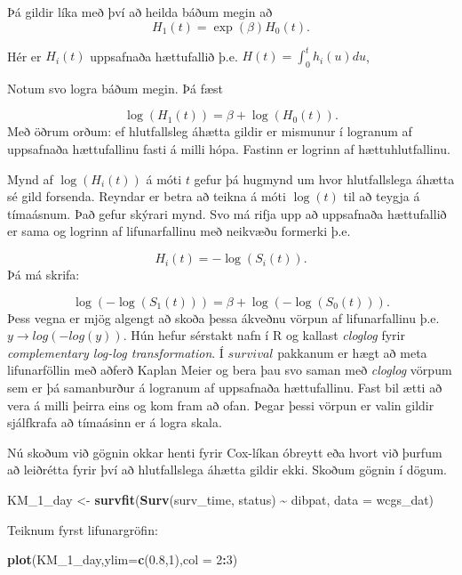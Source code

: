\documentclass[
]{book}
\newenvironment{Shaded}{\begin{snugshade}}{\end{snugshade}}
\newcommand{\DataTypeTok}[1]{\textcolor[rgb]{0.13,0.29,0.53}{#1}}
\newcommand{\DecValTok}[1]{\textcolor[rgb]{0.00,0.00,0.81}{#1}}
\newcommand{\FloatTok}[1]{\textcolor[rgb]{0.00,0.00,0.81}{#1}}
\newcommand{\KeywordTok}[1]{\textcolor[rgb]{0.13,0.29,0.53}{\textbf{#1}}}
\newcommand{\NormalTok}[1]{#1}
\newcommand{\OperatorTok}[1]{\textcolor[rgb]{0.81,0.36,0.00}{\textbf{#1}}}
\newcommand{\StringTok}[1]{\textcolor[rgb]{0.31,0.60,0.02}{#1}}
\begin{document}
Þá gildir líka með því að heilda báðum megin að
\[
H_1(t) = \exp(\beta)H_0(t).
\]

Hér er \(H_i(t)\) uppsafnaða hættufallið þ.e. \(H(t) = \int_0^t h_i(u)du\),

Notum svo logra báðum megin. Þá fæst

\[
\log(H_1(t)) = \beta + \log(H_0(t)).
\]
Með öðrum orðum: ef hlutfallsleg áhætta gildir er mismunur í logranum af uppsafnaða hættufallinu fasti á milli hópa. Fastinn er logrinn af hættuhlutfallinu.

Mynd af \(\log(H_i(t))\) á móti \(t\) gefur þá hugmynd um hvor hlutfallslega áhætta sé gild forsenda. Reyndar er betra að teikna á móti \(\log(t)\) til að teygja á tímaásnum. Það gefur skýrari mynd. Svo má rifja upp að uppsafnaða hættufallið er sama og logrinn af lifunarfallinu með neikvæðu formerki þ.e.

\[
H_i(t) = -\log(S_i(t)).
\]
Þá má skrifa:

\[
\log(-\log(S_1(t))) = \beta + \log(-\log(S_0(t))).
\]
Þess vegna er mjög algengt að skoða þessa ákveðnu vörpun af lifunarfallinu þ.e. \(y \to log(-log(y))\). Hún hefur sérstakt nafn í R og kallast \emph{cloglog} fyrir \emph{complementary log-log transformation}. Í \(survival\) pakkanum er hægt að meta lifunarföllin með aðferð Kaplan Meier og bera þau svo saman með \emph{cloglog} vörpum sem er þá samanburður á logranum af uppsafnaða hættufallinu. Fast bil ætti að vera á milli þeirra eins og kom fram að ofan. Þegar þessi vörpun er valin gildir sjálfkrafa að tímaásinn er á logra skala.

Nú skoðum við gögnin okkar henti fyrir Cox-líkan óbreytt eða hvort við þurfum að leiðrétta fyrir því að hlutfallslega áhætta gildir ekki. Skoðum gögnin í dögum.

\begin{Shaded}
\begin{Highlighting}[]
\NormalTok{KM\_}\DecValTok{1}\NormalTok{\_day <{-}}\StringTok{ }\KeywordTok{survfit}\NormalTok{(}\KeywordTok{Surv}\NormalTok{(surv\_time, status) }\OperatorTok{\textasciitilde{}}\StringTok{ }\NormalTok{dibpat, }\DataTypeTok{data =}\NormalTok{ wcgs\_dat)}
\end{Highlighting}
\end{Shaded}

Teiknum fyrst lifunargröfin:

\begin{Shaded}
\begin{Highlighting}[]
\KeywordTok{plot}\NormalTok{(KM\_}\DecValTok{1}\NormalTok{\_day,}\DataTypeTok{ylim=}\KeywordTok{c}\NormalTok{(}\FloatTok{0.8}\NormalTok{,}\DecValTok{1}\NormalTok{),}\DataTypeTok{col =} \DecValTok{2}\OperatorTok{:}\DecValTok{3}\NormalTok{)}
\end{Highlighting}
\end{Shaded}
\end{document}
